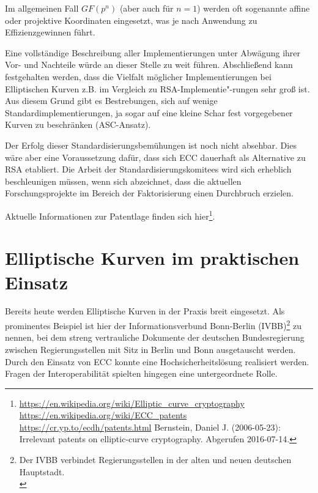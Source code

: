 \begin{refsegment}
Im allgemeinen Fall $GF(p^n)$ (aber auch für $n=1$) werden oft sogenannte affine oder projektive Koordinaten eingesetzt, was je nach Anwendung zu Effizienzgewinnen führt.

Eine vollständige Beschreibung aller Implementierungen unter Abwägung ihrer Vor- und Nachteile würde an dieser Stelle zu weit führen. Abschließend kann festgehalten werden, dass die Vielfalt möglicher Implementierungen bei Elliptischen Kurven z.B. im Vergleich zu RSA-Implementie"-rungen sehr groß ist. Aus diesem Grund gibt es Bestrebungen, sich auf wenige Standardimplementierungen, ja sogar auf eine kleine Schar fest vorgegebener Kurven zu beschränken (ASC-Ansatz).

Der Erfolg dieser Standardisierungsbemühungen ist noch nicht absehbar.
Dies wäre aber eine Voraussetzung dafür, dass sich ECC dauerhaft als
Alternative zu RSA etabliert. Die Arbeit der Standardisierungskomitees wird
sich erheblich beschleunigen müssen, wenn sich abzeichnet, dass die aktuellen
Forschungsprojekte im Bereich der Faktorisierung einen Durchbruch erzielen.

Aktuelle Informationen zur Patentlage finden sich hier\footnote{%
\url{https://en.wikipedia.org/wiki/Elliptic_curve_cryptography}\\
\url{https://en.wikipedia.org/wiki/ECC_patents}\\
\url{https://cr.yp.to/ecdh/patents.html} Bernstein, Daniel J. (2006-05-23):
\glqq Irrelevant patents on elliptic-curve cryptography\grqq. Abgerufen 2016-07-14.
}.


\section{Elliptische Kurven im praktischen Einsatz}

Bereits heute werden Elliptische Kurven in der Praxis breit eingesetzt.
Als prominentes Beispiel ist hier der Informationsverbund Bonn-Berlin (IVBB)\footnote{%
Der IVBB verbindet Regierungsstellen in der alten und neuen deutschen Hauptstadt.\\
} zu nennen, bei dem
streng vertrauliche Dokumente der deutschen Bundesregierung zwischen Regierungsstellen
mit Sitz in Berlin und Bonn ausgetauscht werden. Durch den Einsatz von ECC konnte eine
Hochsicherheitslösung realisiert werden. Fragen der Interoperabilität spielten
hingegen eine untergeordnete Rolle.


\end{refsegment}

